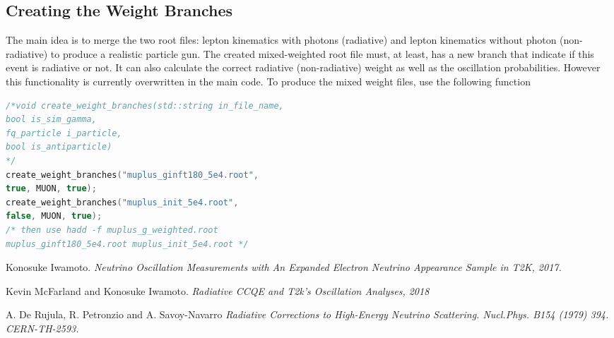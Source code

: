 \documentclass[12pt]{report}
\begin{document}
\subsection{Creating the Weight Branches}
The main idea is to merge the two root files: lepton kinematics with photons (radiative) and lepton kinematics without photon (non-radiative) to produce a realistic particle gun. The created mixed-weighted root file must, at least, has a new branch that indicate if this event is radiative or not. It can also calculate the correct radiative (non-radiative) weight as well as the oscillation probabilities. However this functionality is currently overwritten in the main code.
To produce the mixed weight files, use the following function 
\begin{lstlisting}[language=C++, caption=Creating Weight Branch Example]
/*void create_weight_branches(std::string in_file_name,
bool is_sim_gamma,
fq_particle i_particle,
bool is_antiparticle)
*/
create_weight_branches("muplus_ginft180_5e4.root",
true, MUON, true);
create_weight_branches("muplus_init_5e4.root",
false, MUON, true);
/* then use hadd -f muplus_g_weighted.root
muplus_ginft180_5e4.root muplus_init_5e4.root */							
\end{lstlisting} 



\begin{thebibliography}{9}
	Konosuke Iwamoto. 
	\textit{Neutrino Oscillation Measurements with An Expanded Electron Neutrino Appearance Sample in T2K, 2017.}
	
	
	Kevin McFarland and Konosuke Iwamoto.
	\textit{Radiative CCQE and T2k's Oscillation Analyses, 2018}
	
	A. De Rujula, R. Petronzio and A. Savoy-Navarro
	\textit{Radiative Corrections to High-Energy Neutrino Scattering. Nucl.Phys. B154 (1979) 394. CERN-TH-2593.}
	
\end{thebibliography}
	
\end{document}
